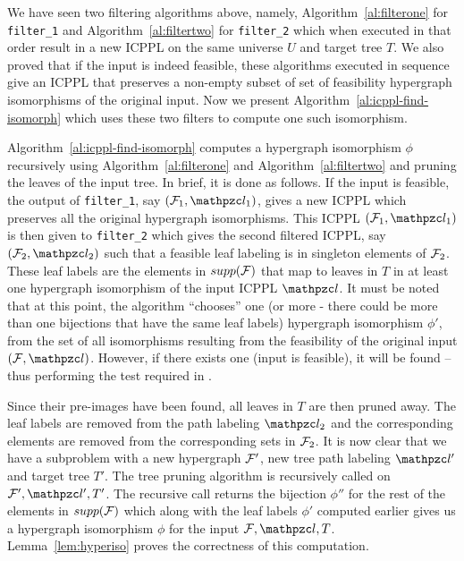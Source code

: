 We have seen two filtering algorithms above, namely,
Algorithm~\ref{al:filterone} for {\tt filter\_1} and
Algorithm~\ref{al:filtertwo} for {\tt filter\_2} which when executed
in that order result in a new ICPPL on the same universe $U$ and
target tree $T$. We also proved that if the input is indeed feasible,
these algorithms executed in sequence give an ICPPL that preserves a
non-empty subset of set of feasibility hypergraph isomorphisms of the
original input. %
Now we present Algorithm~\ref{al:icppl-find-isomorph} which uses these
two filters to compute one such isomorphism.



Algorithm~\ref{al:icppl-find-isomorph} computes a hypergraph
isomorphism $\phi$ recursively using Algorithm~\ref{al:filterone} and
Algorithm~\ref{al:filtertwo} and pruning the leaves of the input
tree. In brief, it is done as follows. If the input is feasible, the
output of {\tt filter\_1}, say $(\cF_1, \cl_1)$, gives a new ICPPL
which preserves all the original hypergraph isomorphisms.  This ICPPL
$(\cF_1, \cl_1)$ is then given to {\tt filter\_2} which gives the
second filtered ICPPL, say $(\cF_2, \cl_2)$ such that a feasible leaf
labeling is in singleton elements of ${\cal F}_2$. These leaf labels are
the elements in $supp({\cal F})$ that map to leaves in $T$ in at least one
hypergraph isomorphism of the input ICPPL $\cl$. It must be noted that
at this point, the algorithm ``chooses'' one (or more - there could be
more than one bijections that have the same leaf labels) hypergraph
isomorphism $\phi'$, from the set of all isomorphisms resulting from the
feasibility of the original input $(\cF, \cl)$. However, if there
exists one (\ie input is feasible), it will be found -- thus
performing the test required in \FTPL.

Since their pre-images have been found, all leaves in $T$ are then
pruned away. The leaf labels are removed from the path labeling
$\cl_2$ and the corresponding elements are removed from the
corresponding sets in ${\cal F}_2$. It is now clear that we have a
subproblem with a new hypergraph ${\cal F}'$, new tree path labeling $\cl'$
and target tree $T'$.  The tree pruning algorithm is recursively
called on $\cF', \cl', T'$. The recursive call returns the bijection
$\phi''$ for the rest of the elements in $supp({\cal F})$ which along with
the leaf labels $\phi'$ computed earlier gives us a hypergraph
isomorphism $\phi$ for the input $\cF,\cl,T$.  
Lemma~\ref{lem:hyperiso} proves the correctness of this computation.

